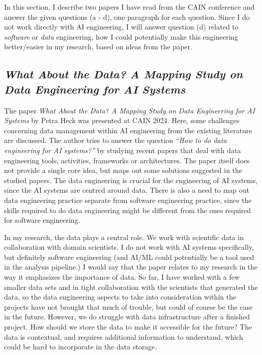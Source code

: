 \documentclass[11pt]{article}
\begin{document}
In this section, I describe two papers I have read from the CAIN conference and answer the given questions (a - d), one paragraph for each question. 
Since I do not work directly with AI engineering, I will answer question (d) related to \emph{software} or \emph{data} engineering, how I could potentially make this engineering better/easier in my research, based on ideas from the paper. 

\subsection{\textit{What About the Data? A Mapping Study on Data Engineering for AI Systems}}

The paper \textit{What About the Data? A Mapping Study on Data Engineering for AI Systems} by Petra Heck \cite{heck_what_about_the_data} was presented at CAIN 2024. Here, some challenges concerning data management within AI engineering from the existing literature are discussed. The author tries to answer the question \textit{``How to do data engineering for AI systems?''} by studying recent papers that deal with data engineering tools, activities, frameworks or architectures.
The paper itself does not provide a single core idea, but maps out some solutions suggested in the studied papers. 
The data engineering is crucial for the engineering of AI systems, since the AI systems are centred around data. 
There is also a need to map out data engineering practice separate from software engineering practice, since the skills required to do data engineering might be different from the ones required for software engineering.


In my research, the data plays a central role. We work with scientific data in collaboration with domain scientists. I do not work with AI systems specifically, but definitely software engineering (and AI/ML could potentially be a tool used in the analysis pipeline.)
I would say that the paper relates to my research in the way it emphasizes the importance of data. 
So far, I have worked with a few smaller data sets and in tight collaboration with the scientists that generated the data, so the data engineering aspects to take into consideration within the projects have not brought that much of trouble, but could of course be the case in the future. 
However, we do struggle with data infrastructure after a finished project. How should we store the data to make it accessible for the future? 
The data is contextual, and requires additional information to understand, which could be hard to incorporate in the data storage.
\end{document}
